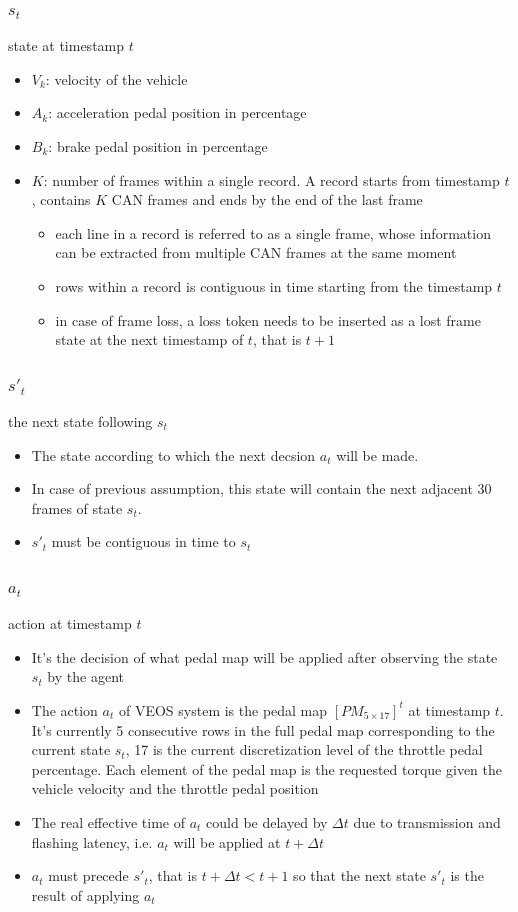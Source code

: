 \documentclass[a4paper, 11pt]{article}
\begin{document}
\subsubsection{\(s_t\)}
\label{sec:org2780722}
state at timestamp \(t\)
\begin{itemize}
\item \(V_k\): velocity of the vehicle
\item \(A_k\): acceleration pedal position in percentage
\item \(B_k\): brake pedal position in percentage
\item \(K\): number of frames within a single record. A record starts from timestamp \(t\), contains \(K\) CAN frames and ends by the end of the last frame
\begin{itemize}
\item each line in a record is referred to as a single frame, whose information can be extracted from multiple CAN frames at the same moment
\item rows within a record is contiguous in time starting from the timestamp \(t\)
\item in case of frame loss, a loss token needs to be inserted as a lost frame state at the next timestamp of \(t\), that is \(t+1\)
\end{itemize}
\end{itemize}
\subsubsection{\(s'_t\)}
\label{sec:org2a05cfe}
the next state following \(s_t\)
\begin{itemize}
\item The state according to which the next decsion \(a_t\) will be made.
\item In case of previous assumption, this state will contain the next adjacent 30 frames of state \(s_t\).
\item \(s'_t\) must be contiguous in time to \(s_t\)
\end{itemize}
\subsubsection{\(a_t\)}
\label{sec:org0eb1c05}
action at timestamp \(t\)
\begin{itemize}
\item It's the decision of what pedal map will be applied after observing the state \(s_t\) by the agent
\item The action \(a_t\) of VEOS system is the pedal map \([PM_{5\times17}]^t\) at timestamp \(t\). It's currently 5 consecutive rows in the full pedal map corresponding to the current state \(s_t\), 17 is the current discretization level of the throttle pedal percentage. Each element of the pedal map is the requested torque given the vehicle velocity and the throttle pedal position
\item The real effective time of \(a_t\) could be delayed by \(\Delta t\) due to transmission and flashing latency, i.e. \(a_t\) will be applied at \(t+\Delta t\)
\item \(a_t\) must precede \(s'_t\), that is \(t+\Delta t < t+1\) so that the next state \(s'_t\) is the result of applying \(a_t\)
\end{itemize}
\end{document}

